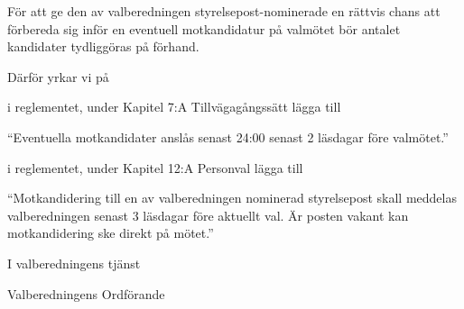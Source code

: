 \documentclass[../_main/handlingar.tex]{subfiles}
\begin{document}

För att ge den av valberedningen styrelsepost-nominerade en rättvis chans att förbereda sig inför en eventuell motkandidatur på valmötet bör antalet kandidater tydliggöras på förhand.


Därför yrkar vi på
\begin{attsatser}
    \att i reglementet, under Kapitel 7:A Tillvägagångssätt lägga till \par
    \begin{itshape}
        ``Eventuella motkandidater anslås senast 24:00 senast 2 läsdagar före valmötet.''
    \end{itshape}
    \att i reglementet, under Kapitel 12:A Personval lägga till \par
    \begin{itshape}
        ``Motkandidering till en av valberedningen nominerad styrelsepost skall meddelas valberedningen senast 3 läsdagar före aktuellt val. Är posten vakant kan motkandidering ske direkt på mötet.''
    \end{itshape}
\end{attsatser}

\begin{signatures}{1}
    I valberedningens tjänst
    \signature{Elin Magnusson}{Valberedningens Ordförande}
\end{signatures}
\end{document}
